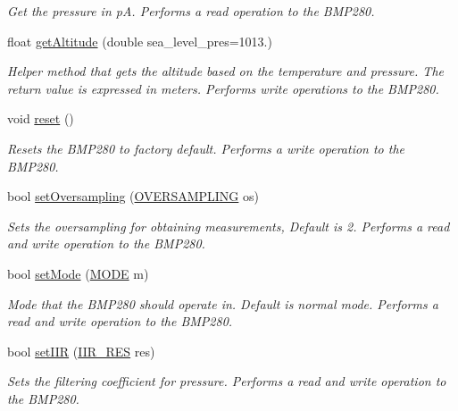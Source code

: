 \begin{DoxyCompactItemize}
\begin{DoxyCompactList}\small\item\em Get the pressure in pA. Performs a read operation to the B\+M\+P280. \end{DoxyCompactList}\item 
float \mbox{\hyperlink{classbmp280_a9f477a87343ddd8a49cdd88210bd80cb}{get\+Altitude}} (double sea\+\_\+level\+\_\+pres=1013.)
\begin{DoxyCompactList}\small\item\em Helper method that gets the altitude based on the temperature and pressure. The return value is expressed in meters. Performs write operations to the B\+M\+P280. \end{DoxyCompactList}\item 
\mbox{\label{classbmp280_aa51e3a6cb1a602145e8efa2c81f9455f}} 
void \mbox{\hyperlink{classbmp280_aa51e3a6cb1a602145e8efa2c81f9455f}{reset}} ()
\begin{DoxyCompactList}\small\item\em Resets the B\+M\+P280 to factory default. Performs a write operation to the B\+M\+P280. \end{DoxyCompactList}\item 
bool \mbox{\hyperlink{classbmp280_afcbdb0160669a3d428e25bd715239fd5}{set\+Oversampling}} (\mbox{\hyperlink{bmp280_8hpp_a8eb2f33991b63046b2887939a003837f}{O\+V\+E\+R\+S\+A\+M\+P\+L\+I\+NG}} os)
\begin{DoxyCompactList}\small\item\em Sets the oversampling for obtaining measurements, Default is 2. Performs a read and write operation to the B\+M\+P280. \end{DoxyCompactList}\item 
bool \mbox{\hyperlink{classbmp280_a7304149cb12a908febd5ba9109ef2d5d}{set\+Mode}} (\mbox{\hyperlink{bmp280_8hpp_a4fa86f9d2218a1052a2f337ec17984d3}{M\+O\+DE}} m)
\begin{DoxyCompactList}\small\item\em Mode that the B\+M\+P280 should operate in. Default is normal mode. Performs a read and write operation to the B\+M\+P280. \end{DoxyCompactList}\item 
bool \mbox{\hyperlink{classbmp280_a379f05aa177d55e99bd3a098e2efced1}{set\+I\+IR}} (\mbox{\hyperlink{bmp280_8hpp_a67b0684f2b007e72879b3ec3928a4a40}{I\+I\+R\+\_\+\+R\+ES}} res)
\begin{DoxyCompactList}\small\item\em Sets the filtering coefficient for pressure. Performs a read and write operation to the B\+M\+P280. \end{DoxyCompactList}\item 

\end{DoxyCompactItemize}
